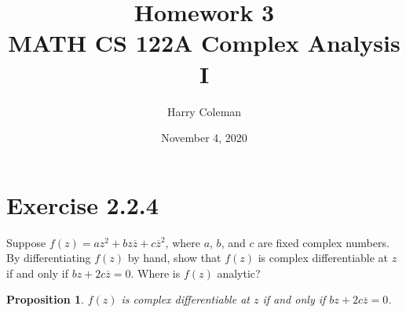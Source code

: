 \documentclass[12pt]{article}
\newtheorem{proposition}{Proposition}
\newenvironment{problem}
    {\begin{lrbox}{\mybox}\begin{minipage}{\textwidth-10pt}}
    {\end{minipage}\end{lrbox}\framebox[6.5in]{\usebox{\mybox}}}
\newcommand{\conj}[1]{\overline{#1}}
\begin{document}
 
\title{Homework 3\\
    \large MATH CS 122A Complex Analysis I
}
\author{Harry Coleman}
\date{November 4, 2020}
\maketitle

\section*{Exercise 2.2.4}
\begin{problem}
    Suppose $f(z) = az^2 + bz\conj{z} + c\conj{z}^2$, where $a$, $b$, and $c$ are fixed complex numbers. By differentiating $f(z)$ by hand, show that $f(z)$ is complex differentiable at $z$ if and only if $bz+2c\conj{z}=0$. Where is $f(z)$ analytic?
\end{problem}

\begin{proposition}
    $f(z)$ is complex differentiable at $z$ if and only if $bz+2c\conj{z}=0$.
\end{proposition}
\end{document}
